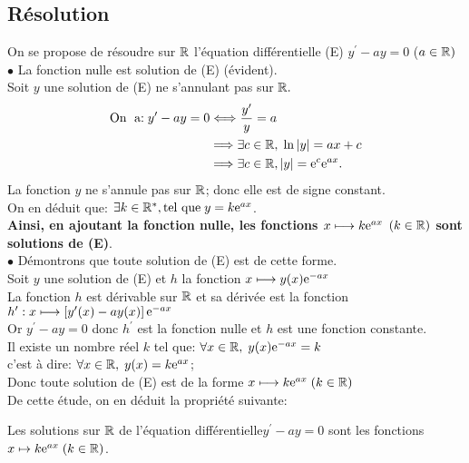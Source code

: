 \subsection*{Résolution}
On se propose de résoudre sur $ \mathbb{R} $ l'équation différentielle (E) $ y^{\prime} -ay=0$\; ($ a\in \mathbb{R}) $\\
$ \bullet $ La fonction nulle est solution de (E) \;(évident).\\
Soit $ y $  une solution de (E) ne s'annulant pas sur $ \mathbb{R}.$
\begin{align*}
\text{On \;a:\;}   y^{\prime} -ay=0& \Longleftrightarrow  \frac{y^{\prime}}{y}=a\\
&\Longrightarrow \exists c\in \mathbb{R}, \; \ln\left\lvert y \right\rvert=ax+c \\
&\Longrightarrow \exists c\in \mathbb{R}, \left\lvert y \right\rvert=\mathrm{e}^{c}\mathrm{e}^{ax}.
\end{align*}
La fonction $ y $ ne s'annule pas sur $ \mathbb{R} $; donc elle est de signe constant.\\ On en déduit que:  $ \exists k\in \mathbb{R}^*,\text{tel que}\; y=k\mathrm{e}^{ax} $.\\  \textbf{ Ainsi, en ajoutant la fonction nulle, les fonctions \; $ x\longmapsto k\mathrm{e}^{ax} $\;  $ (k\in \mathbb{R}) $\; sont solutions de (E)}.\\
$ \bullet $ Démontrons que toute solution de (E) est de  cette forme.\\Soit
$ y $  une solution de (E) et $ h $ la fonction \;$ x  \longmapsto y(x)\mathrm{e}^{-ax} $\\La fonction $ h $ est dérivable sur $ \mathbb{R} $   et sa dérivée est la fonction $ h^{\prime}: x\longmapsto \left[ y^{\prime}(x)-ay(x) \right]\mathrm{e}^{-ax} $\\ Or \; $ y^{\prime}-ay=0 $\; donc $ h^{\prime} $ est la fonction nulle et $ h $ est une fonction constante.\\ Il existe un nombre réel  $ k $ tel que: $ \forall x\in\mathbb{R},\; y(x)\mathrm{e}^{-ax}=k $\\ c'est à dire: $ \forall x\in\mathbb{R}, \; y(x)=k\mathrm{e}^{ax} $;\\ Donc toute solution de (E) est de la forme\; $ x\longmapsto k\mathrm{e}^{ax}\; (k\in\mathbb{R}) $\\
De cette étude, on en déduit la propriété suivante:

\medskip

\begin{property}
Les solutions sur $ \mathbb{R} $ de l'équation différentielle\;$ y^{\prime}-ay=0 $\; sont les fonctions \; $ x\mapsto k\mathrm{e}^{ax}\; (k\in\mathbb{R}) $.
\end{property}

